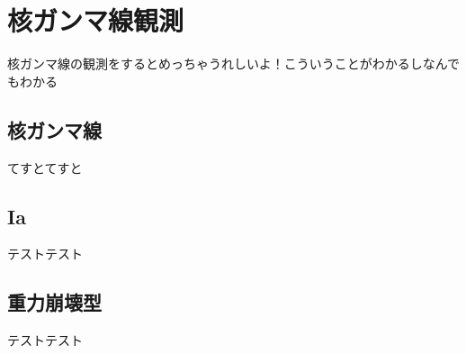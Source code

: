\def\PicPath{/Users/ken/Documents/shuron/chapter1/1_2}

\begin{comment}

(図\ref{fig:science_sensitivity})
\begin{figure}
\centering
\texttt{[image: \\PicPath/atmosphere\_absorption.png]}
\caption{大気による様々な波長の電磁波の吸収（出典？？）\cite{oda_and_matsuoka}}
\label{fig:atm_absp}
\end{figure}

\end{comment}

\section{核ガンマ線観測}
核ガンマ線の観測をするとめっちゃうれしいよ！こういうことがわかるしなんでもわかる
\subsection{核ガンマ線}
てすとてすと
\subsection{Ia}
テストテスト
\subsection{重力崩壊型}
テストテスト



